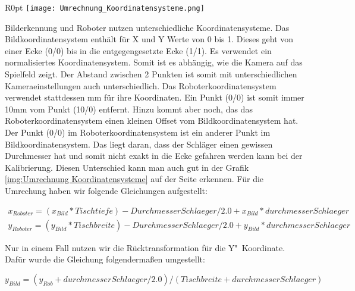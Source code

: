 \begin{wrapfigure}{R}{0pt}
	\vspace{-15pt}
	\texttt{[image: Umrechnung\_Koordinatensysteme.png]}
	\vspace{-15pt}
	\caption{ Veranschaulichung der Koordinatensystemunterschiede}
	\vspace{-15pt}
	\label{img:Umrechnung Koordinatensysteme}
\end{wrapfigure}

Bilderkennung und Roboter nutzen unterschiedliche Koordinatensysteme. Das Bildkoordinatensystem enthält für X und Y Werte von 0 bis 1. Dieses geht von einer Ecke (0/0) bis in die entgegengesetzte Ecke (1/1). Es verwendet ein normalisiertes Koordinatensystem. Somit ist es abhängig, wie die Kamera auf das Spielfeld zeigt. Der Abstand zwischen 2 Punkten ist somit mit unterschiedlichen Kameraeinstellungen auch unterschiedlich. Das Roboterkoordinatensystem verwendet stattdessen mm für ihre Koordinaten. Ein Punkt (0/0) ist somit immer 10mm vom Punkt (10/0) entfernt. Hinzu kommt aber noch, das das Roboterkoordinatensystem einen kleinen Offset vom Bildkoordinatensystem hat. Der Punkt (0/0) im Roboterkoordinatensystem ist ein anderer Punkt im Bildkoordinatensystem. Das liegt daran, dass der Schläger einen gewissen Durchmesser hat und somit nicht exakt in die Ecke gefahren werden kann bei der Kalibrierung. Diesen Unterschied kann man auch gut in der Grafik \ref{img:Umrechnung Koordinatensysteme} auf der Seite \pageref{img:Umrechnung Koordinatensysteme} erkennen. Für die Umrechung haben wir folgende Gleichungen aufgestellt:

$
\begin{array}{c}
x_{Roboter} = (x_{Bild} * Tischtiefe) - Durchmesser Schlaeger / 2.0 + x_{Bild} * durchmesserSchlaeger \\
y_{Roboter} = (y_{Bild} * Tischbreite) - Durchmesser Schlaeger / 2.0 + y_{Bild} * durchmesserSchlaeger
\end{array}
$

Nur in einem Fall nutzen wir die Rücktransformation für die Y"~Koordinate. Dafür wurde die Gleichung folgendermaßen umgestellt:

$y_{Bild} = (y_{Rob} + durchmesserSchlaeger / 2.0) / (Tischbreite +  durchmesserSchlaeger)$ 